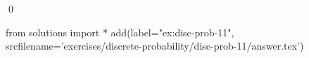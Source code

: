 
\begin{ex} 
  \label{ex:disc-prob-11}
  
  \qed
\end{ex} 
\begin{python0}
from solutions import *
add(label="ex:disc-prob-11",
    srcfilename='exercises/discrete-probability/disc-prob-11/answer.tex') 
\end{python0}
